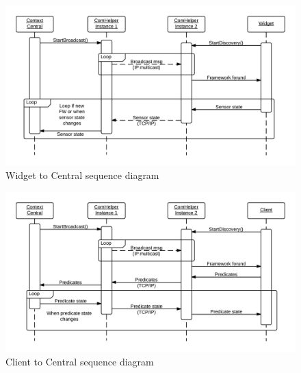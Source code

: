 \documentclass[../report.tex]{subfiles}
\begin{document}
\begin{figure}[h]
\centering
\includegraphics[width=\linewidth]{comHelperSequence-widget.png}
\caption{Widget to Central sequence diagram}
\label{fig:widgetComHelper}
\end{figure}

\begin{figure}[h]
\centering
\includegraphics[width=\linewidth]{comHelperSequence-client.png}
\caption{Client to Central sequence diagram}
\label{fig:clientComHelper}
\end{figure}
\end{document}
